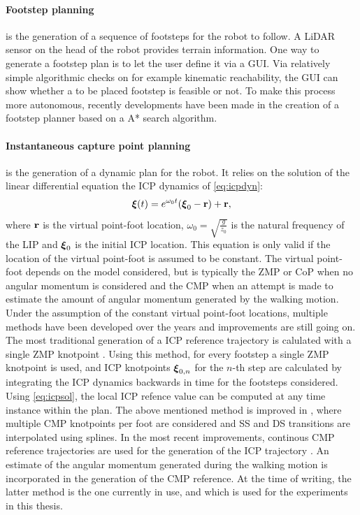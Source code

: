 \paragraph{Footstep planning} is the generation of a sequence of footsteps for the robot to follow. A \ac{LiDAR} sensor on the head of the robot provides terrain information. One way to generate a footstep plan is to let the user define it via a \ac{GUI}. Via relatively simple algorithmic checks on for example kinematic reachability, the \ac{GUI} can show whether a to be placed footstep is feasible or not. To make this process more autonomous, recently developments have been made in the creation of a footstep planner based on a A* search algorithm. 
\paragraph{Instantaneous capture point planning}\label{subsec:icpplan} is the generation of a dynamic plan for the robot. It relies on the solution of the linear differential equation the \ac{ICP} dynamics of \eqref{eq:icpdyn}:
\begin{equation}\label{eq:icpsol}
	\boldsymbol{\xi}(t)=e^{\omega_0t}(\boldsymbol{\xi}_0- \mathbf{r}) + \mathbf{r},
\end{equation}
where $\mathbf{r}$ is the virtual point-foot location, $\omega_0=\sqrt{\frac{g}{z_0}}$ is the natural frequency of the \ac{LIP} and $\boldsymbol{\xi}_0$ is the initial \ac{ICP} location. This equation is only valid if the location of the virtual point-foot is assumed to be constant. The virtual point-foot depends on the model considered, but is typically the \ac{ZMP} or \ac{CoP} when no angular momentum is considered and the \ac{CMP} when an attempt is made to estimate the amount of angular momentum generated by the walking motion. 
\paraskip
Under the assumption of the constant virtual point-foot locations, multiple methods have been developed over the years and improvements are still going on. The most traditional generation of a \ac{ICP} reference trajectory is calulated with a single \ac{ZMP} knotpoint \cite{englsberger2012integration}. Using this method, for every footstep a single \ac{ZMP} knotpoint is used, and \ac{ICP} knotpoints $\boldsymbol{\xi}_{0,n}$ for the $n$-th step are calculated by integrating the \ac{ICP} dynamics backwards in time for the footsteps considered. Using \eqref{eq:icpsol}, the local \ac{ICP} refence value can be computed at any time instance within the plan. 
\paraskip
The above mentioned method is improved in \cite{englsberger2014trajectory}, where multiple \ac{CMP} knotpoints per foot are considered and \ac{SS} and \ac{DS} transitions are interpolated using splines. In the most recent improvements, continous \ac{CMP} reference trajectories are used for the generation of the \ac{ICP} trajectory \cite{seyde2018inclusion}. An estimate of the angular momentum generated during the walking motion is incorporated in the generation of the \ac{CMP} reference. At the time of writing, the latter method is the one currently in use, and which is used for the experiments in this thesis.
